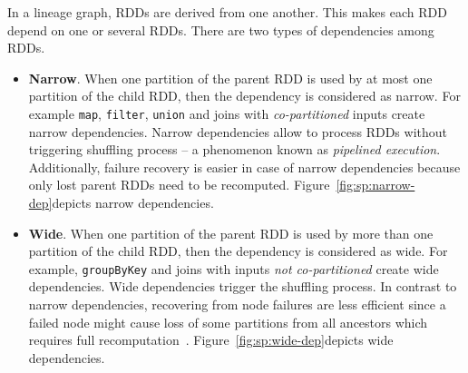 In a lineage graph, RDDs are derived from one another. This makes each RDD depend on one or several RDDs. There are two types of dependencies among RDDs.
\begin{itemize}
    \item \textbf{Narrow}. When one partition of the parent RDD is used by at most one partition of the child RDD, then the dependency is considered as narrow. For example \lstinline$map$, \lstinline$filter$, \lstinline$union$ and joins with \emph{co-partitioned} inputs create narrow dependencies. Narrow dependencies allow to process RDDs without triggering shuffling process -- a phenomenon known as \emph{pipelined execution}. Additionally, failure recovery is easier in case of narrow dependencies because only lost parent RDDs need to be recomputed. Figure~\ref{fig:sp:narrow-dep}\footnotemark depicts narrow dependencies.
    \item \textbf{Wide}. When one partition of the parent RDD is used by more than one partition of the child RDD, then the dependency is considered as wide. For example, \lstinline$groupByKey$ and joins with inputs \emph{not co-partitioned} create wide dependencies. Wide dependencies trigger the shuffling process. In contrast to narrow dependencies, recovering from node failures are less efficient since a failed node might cause loss of some partitions from all ancestors which requires full recomputation~\cite{Zaharia:2012}. Figure~\ref{fig:sp:wide-dep}\footnotemark[\value{footnote}] depicts wide dependencies.
    \begin{figure}[p]
        \centering

\end{figure}
\end{itemize}
